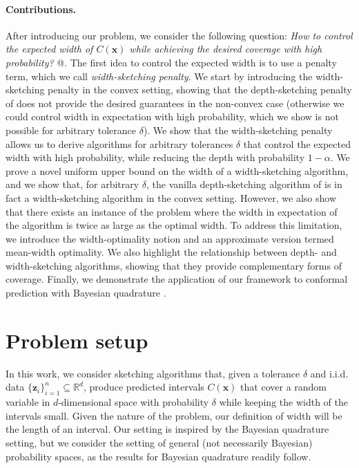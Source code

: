 \paragraph{Contributions.} After introducing our problem, we consider the following question:
\emph{How to control the expected width of $C(\bm{x})$ while achieving the desired coverage with high probability?} 
@. 
The first idea to control the expected width is to use a penalty term, which we call \emph{width-sketching penalty}. We start by introducing the width-sketching penalty in the convex setting, showing that the depth-sketching penalty of \cite{angelopoulos2024conformal} does not provide the desired guarantees in the non-convex case (otherwise we could control width in expectation with high probability, which we show is not possible for arbitrary tolerance $\delta$). We show that the width-sketching penalty allows us to derive algorithms for arbitrary tolerances $\delta$ that control the expected width with high probability, while reducing the depth with probability $1-\alpha$. We prove a novel uniform upper bound on the width of a width-sketching algorithm, and we show that, for arbitrary $\delta$, the vanilla depth-sketching algorithm of \cite{angelopoulos2024conformal} is in fact a width-sketching algorithm in the convex setting. However, we also show that there exists an instance of the problem where the width in expectation of the algorithm is twice as large as the optimal width. To address this limitation, we introduce the width-optimality notion and an approximate version termed mean-width optimality. 
We also highlight the relationship between depth- and width-sketching algorithms, showing that they provide complementary forms of coverage. Finally, we demonstrate the application of our framework to conformal prediction with Bayesian quadrature \citep[see, e.g.,][and many other works that follow]{diaconis1988bayesian, karvonen2017classical,cockayne2019bayesian,hennig2022probabilistic,hobbhahn2022fast}.



\section{Problem setup}

In this work, we consider sketching algorithms that, given a tolerance $\delta$ and i.i.d. data $\{ \bm z_i \}_{i=1}^{n} \subseteq \mathbb{R}^d$, produce predicted intervals $C(\bm{x})$ that cover a random variable in $d$-dimensional space with probability $\delta$ while keeping the width of the intervals small. Given the nature of the problem, our definition of width will be the length of an interval.
Our setting is inspired by the Bayesian quadrature setting, but we consider the setting of general (not necessarily Bayesian) probability spaces, as the results for Bayesian quadrature readily follow. 

